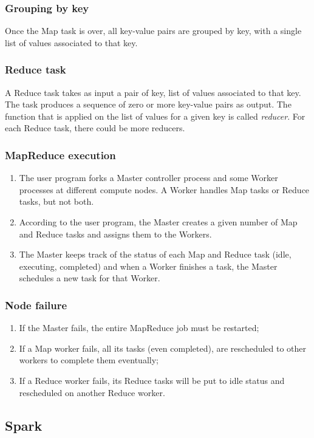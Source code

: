 \documentclass[\main/main.tex]{subfiles}
\begin{document}
\subsubsection{Grouping by key}
Once the Map task is over, all key-value pairs are grouped by key, with a single list of values associated to that key.
\subsubsection{Reduce task}
A Reduce task takes as input a pair of key, list of values associated to that key. The task produces a sequence of zero or more key-value pairs as output. The function that is applied on the list of values for a given key is called \emph{reducer}. For each Reduce task, there could be more reducers.
\subsubsection{MapReduce execution}
\begin{enumerate}
    \item The user program forks a Master controller process and some Worker processes at different compute nodes. A Worker handles Map tasks or Reduce tasks, but not both.
    \item According to the user program, the Master creates a given number of Map and Reduce tasks and assigns them to the Workers.
    \item The Master keeps track of the status of each Map and Reduce task (idle, executing, completed) and when a Worker finishes a task, the Master schedules a new task for that Worker.
\end{enumerate}
\subsubsection{Node failure}
\begin{enumerate}
    \item If the Master fails, the entire MapReduce job must be restarted;
    \item If a Map worker fails, all its tasks (even completed), are rescheduled to other workers to complete them eventually;
    \item If a Reduce worker fails, its Reduce tasks will be put to idle status and rescheduled on another Reduce worker.
\end{enumerate}
\subsection{Spark}
\end{document}
